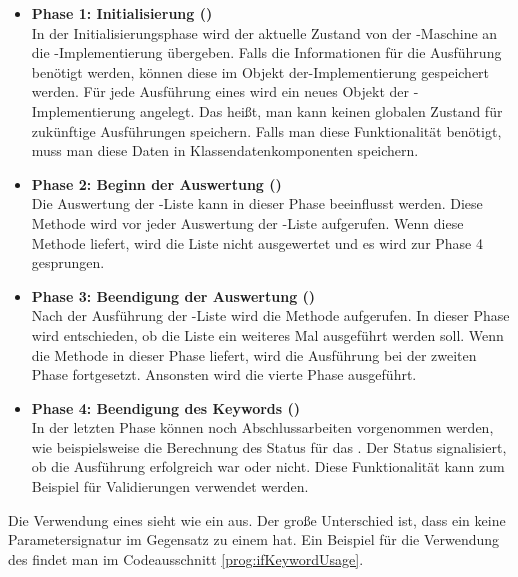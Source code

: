 \begin{itemize}

\item \textbf{Phase 1: Initialisierung ()}\\
In der Initialisierungsphase wird der aktuelle Zustand von der -Maschine an die -Implementierung übergeben. Falls die Informationen für die Ausführung benötigt werden, können diese im Objekt der-Implementierung gespeichert werden. Für jede Ausführung eines  wird ein neues Objekt der -Implementierung angelegt. Das heißt, man kann keinen globalen Zustand für zukünftige Ausführungen speichern. Falls man diese Funktionalität benötigt, muss man diese Daten in Klassendatenkomponenten speichern.\\

\item \textbf{Phase 2: Beginn der Auswertung ()}\\
Die Auswertung der -Liste kann in dieser Phase beeinflusst werden. Diese Methode wird vor jeder Auswertung der -Liste aufgerufen. Wenn diese Methode  liefert, wird die Liste nicht ausgewertet und es wird zur Phase 4 gesprungen.\\

\item \textbf{Phase 3: Beendigung der Auswertung ()}\\
Nach der Ausführung der -Liste wird die Methode  aufgerufen. In dieser Phase wird entschieden, ob die Liste ein weiteres Mal ausgeführt werden soll. Wenn die Methode in dieser Phase  liefert, wird die Ausführung bei der zweiten Phase fortgesetzt. Ansonsten wird die vierte Phase ausgeführt.\\

\item \textbf{Phase 4: Beendigung des Keywords ()}\\
In der letzten Phase können noch Abschlussarbeiten vorgenommen werden, wie beispielsweise die Berechnung des Status für das . Der Status signalisiert, ob die Ausführung erfolgreich war oder nicht. Diese Funktionalität kann zum Beispiel für Validierungen verwendet werden.

\end{itemize}

\SuperPar
Die Verwendung eines  sieht wie ein  aus. Der große Unterschied ist, dass ein  keine Parametersignatur im Gegensatz zu einem  hat. Ein Beispiel für die Verwendung des  findet man im Codeausschnitt \ref{prog:ifKeywordUsage}.

